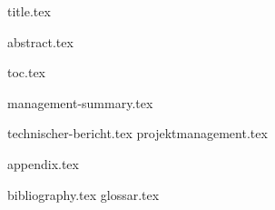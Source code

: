 \documentclass{scrbook}
\begin{document}
	\frontmatter
		{title.tex} 

		\clearpage
		{abstract.tex}

        \clearpage
        {toc.tex}

		{management-summary.tex}


	\mainmatter
		{technischer-bericht.tex}
		{projektmanagement.tex}
	
	\cleardoublepage
	\appendix
		{appendix.tex}

		
	\backmatter
		{bibliography.tex}
		{glossar.tex}
	
\end{document}
